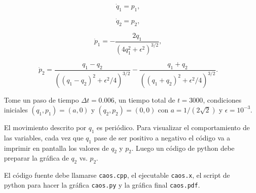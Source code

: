 \documentclass[11pt,letterpaper]{exam}
\begin{document}
\begin{questions}
\begin{equation}
\dot{q}_1 = p_1,
\end{equation}

\begin{equation}
\dot{q}_2 = p_2,
\end{equation}

\begin{equation}
\dot{p}_1 = -\frac{2q_1}{(4q_1^2 + \epsilon^2)^{3/2}},
\end{equation}

\begin{equation}
\dot{p}_2 = \frac{q_1 - q_2}{((q_1 - q_2)^2 + \epsilon^2/4)^{3/2}} -
\frac{q_1+q_2}{((q_1 + q_2)^2 + \epsilon^{2}/4)^{3/2}}.
\end{equation}


Tome un paso de tiempo $\Delta t=0.006$, un tiempo total de
$t=3000$, condiciones iniciales $(q_1, p_1)=(a,0)$ y $(q_2,
p_2)=(0,0)$ con $a=1/(2\sqrt{2})$ y $\epsilon=10^{-3}$.


El movimiento descrito por $q_1$ es peri\'odico. Para visualizar el
comportamiento de las variables, cada vez que $q_1$ pase de ser
positivo a negativo el c\'odigo va a imprimir en pantalla los valores de $q_2$
y $p_2$.  Luego un c\'odigo de python debe preparar la gr\'afica de
$q_2$ vs. $p_2$.

El c\'odigo fuente debe llamarse \verb"caos.cpp", el ejecutable
\verb"caos.x", el script de python para hacer la gr\'afica
\verb"caos.py" y la gr\'afica final \verb"caos.pdf".



\end{questions}
\end{document}
